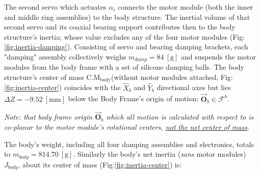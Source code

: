 \par
The second servo which actuates $\alpha_i$ connects the motor module (both the inner and middle ring assemblies) to the body structure. The inertial volume of that second servo and its coaxial bearing support contributes then to the body structure's inertia; whose value excludes any of the four motor modules (Fig:\ref{fig:inertia-damping}). Consisting of servo and bearing damping brackets, each "damping" assembly collectively weighs $m_{damp}=84~[\text{g}]$ and suspends the motor modules from the body frame with a set of silicone damping balls. The body structure's center of mass $\text{C.M}_{\text{body}}$(without motor modules attached, Fig:\ref{fig:inertia-center}) coincides with the $\hat{X}_b$ and $\hat{Y}_b$ directional axes but lies $\Delta Z=-9.52~[\text{mm}]$ below the Body Frame's origin of motion; $\vec{\mathbf{O}}_b\in\mathcal{F}^b$.
\par
\emph{\color{Gray}Note: that body frame origin $\vec{\mathbf{O}}_b$ which all motion is calculated with respect to is co-planar to the motor module's rotational centers, \underline{not the net center of mass}.}
\par
The body's weight, including all four damping assemblies and electronics, totals to $m_{body}=814.70~[\text{g}]$. Similarly the body's net inertia (\emph{sans} motor modules) $J_{body}$, about its center of mass (Fig:\ref{fig:inertia-center}) is:

